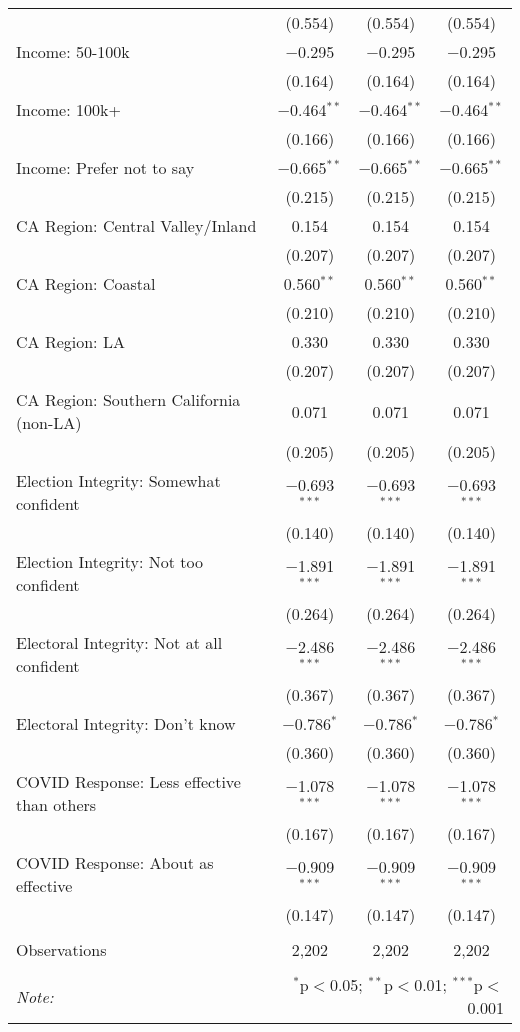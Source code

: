 \begin{table}[!htbp]
\begin{tabular}{@{\extracolsep{5pt}}lccc}
  & (0.554) & (0.554) & (0.554) \\ 
  Income: 50-100k & $-$0.295 & $-$0.295 & $-$0.295 \\ 
  & (0.164) & (0.164) & (0.164) \\ 
  Income: 100k+ & $-$0.464$^{**}$ & $-$0.464$^{**}$ & $-$0.464$^{**}$ \\ 
  & (0.166) & (0.166) & (0.166) \\ 
  Income: Prefer not to say & $-$0.665$^{**}$ & $-$0.665$^{**}$ & $-$0.665$^{**}$ \\ 
  & (0.215) & (0.215) & (0.215) \\ 
  CA Region: Central Valley/Inland & 0.154 & 0.154 & 0.154 \\ 
  & (0.207) & (0.207) & (0.207) \\ 
  CA Region: Coastal & 0.560$^{**}$ & 0.560$^{**}$ & 0.560$^{**}$ \\ 
  & (0.210) & (0.210) & (0.210) \\ 
  CA Region: LA & 0.330 & 0.330 & 0.330 \\ 
  & (0.207) & (0.207) & (0.207) \\ 
  CA Region: Southern California (non-LA) & 0.071 & 0.071 & 0.071 \\ 
  & (0.205) & (0.205) & (0.205) \\ 
  Election Integrity: Somewhat confident & $-$0.693$^{***}$ & $-$0.693$^{***}$ & $-$0.693$^{***}$ \\ 
  & (0.140) & (0.140) & (0.140) \\ 
  Election Integrity: Not too confident & $-$1.891$^{***}$ & $-$1.891$^{***}$ & $-$1.891$^{***}$ \\ 
  & (0.264) & (0.264) & (0.264) \\ 
  Electoral Integrity: Not at all confident & $-$2.486$^{***}$ & $-$2.486$^{***}$ & $-$2.486$^{***}$ \\ 
  & (0.367) & (0.367) & (0.367) \\ 
  Electoral Integrity: Don't know & $-$0.786$^{*}$ & $-$0.786$^{*}$ & $-$0.786$^{*}$ \\ 
  & (0.360) & (0.360) & (0.360) \\ 
  COVID Response: Less effective than others & $-$1.078$^{***}$ & $-$1.078$^{***}$ & $-$1.078$^{***}$ \\ 
  & (0.167) & (0.167) & (0.167) \\ 
  COVID Response: About as effective & $-$0.909$^{***}$ & $-$0.909$^{***}$ & $-$0.909$^{***}$ \\ 
  & (0.147) & (0.147) & (0.147) \\ 
 \hline \\[-1.8ex] 
Observations & 2,202 & 2,202 & 2,202 \\ 
\hline 
\hline \\[-1.8ex] 
\textit{Note:}  & \multicolumn{3}{r}{$^{*}$p$<$0.05; $^{**}$p$<$0.01; $^{***}$p$<$0.001} \\ 
\end{tabular} 
\end{table} 
